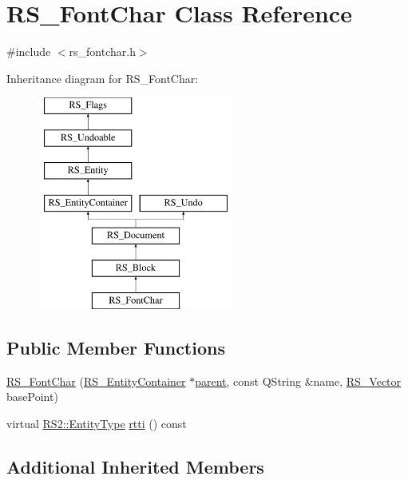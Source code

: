 \hypertarget{classRS__FontChar}{\section{R\-S\-\_\-\-Font\-Char Class Reference}
\label{classRS__FontChar}
}


{\ttfamily \#include $<$rs\-\_\-fontchar.\-h$>$}

Inheritance diagram for R\-S\-\_\-\-Font\-Char\-:\begin{figure}[H]
\begin{center}
\leavevmode
\includegraphics[height=7.000000cm]{classRS__FontChar}
\end{center}
\end{figure}
\subsection*{Public Member Functions}
\begin{DoxyCompactItemize}
\item 
\hyperlink{classRS__FontChar_a5f3dface6b6067e4fe28fc7d49e409d1}{R\-S\-\_\-\-Font\-Char} (\hyperlink{classRS__EntityContainer}{R\-S\-\_\-\-Entity\-Container} $\ast$\hyperlink{classRS__Entity_a80358a8d2fc6739a516a278dc500b49f}{parent}, const Q\-String \&name, \hyperlink{classRS__Vector}{R\-S\-\_\-\-Vector} base\-Point)
\item 
virtual \hyperlink{classRS2_a8f26d1b981e1e85cff16738b43337e6a}{R\-S2\-::\-Entity\-Type} \hyperlink{classRS__FontChar_ad2def8b71fd8a1cb6b2c18b91cafb90a}{rtti} () const 
\end{DoxyCompactItemize}
\subsection*{Additional Inherited Members}


